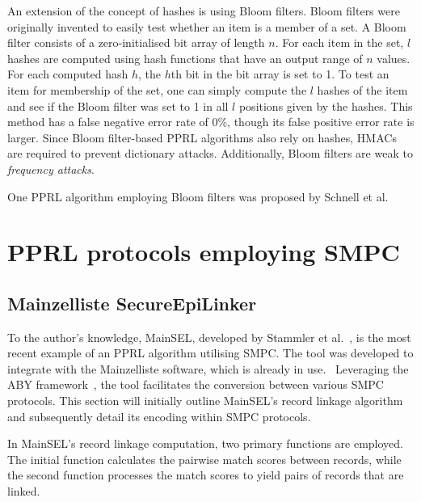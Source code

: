 An extension of the concept of hashes is using Bloom filters. %
Bloom filters were originally invented to easily test whether an item is a member of a set.
A Bloom filter consists of a zero-initialised bit array of length $n$.
For each item in the set, $l$ hashes are computed using hash functions that have an output range of $n$ values.
For each computed hash $h$, the $h$th bit in the bit array is set to 1.
To test an item for membership of the set, one can simply compute the $l$ hashes of the item and see if the Bloom filter was set to 1 in all $l$ positions given by the hashes.
This method has a false negative error rate of 0\%, though its false positive error rate is larger.
Since Bloom filter-based \ac{PPRL} algorithms also rely on hashes, \ac{HMAC}s are required to prevent dictionary attacks.
Additionally, Bloom filters are weak to \textit{frequency attacks}. %

One \ac{PPRL} algorithm employing Bloom filters was proposed by Schnell et al. %
\section{PPRL protocols employing SMPC}
\cite{lazrigPrivacyPreservingProbabilistic2018} %
\cite{laudPrivacypreservingRecordLinkage2018} %
\cite{chenPerfectlySecureEfficient2018} %
\subsection{Mainzelliste SecureEpiLinker}
To the author's knowledge, \ac{MainSEL}, developed by Stammler et al.~\cite{stammlerMainzellisteSecureEpiLinkerMainSEL2022}, is the most recent example of an \ac{PPRL} algorithm utilising \ac{SMPC}.
The tool was developed to integrate with the Mainzelliste software, which is already in use.~\cite{lablansRESTfulInterfacePseudonymization2015} %
Leveraging the \ac{ABY} framework~\cite{demmlerABYFrameworkEfficient2015}, the tool facilitates the conversion between various \ac{SMPC} protocols.
This section will initially outline \ac{MainSEL}'s record linkage algorithm and subsequently detail its encoding within \ac{SMPC} protocols.

In \ac{MainSEL}'s record linkage computation, two primary functions are employed.
The initial function calculates the pairwise match scores between records, while the second function processes the match scores to yield pairs of records that are linked. %

